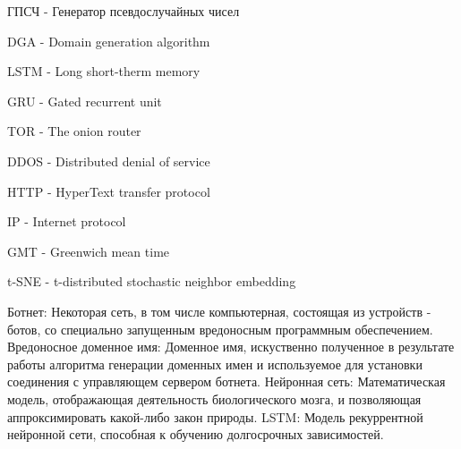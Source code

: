 \noindent ГПСЧ - Генератор псевдослучайных чисел

\noindent DGA - Domain generation algorithm

\noindent LSTM - Long short-therm memory

\noindent GRU - Gated recurrent unit

\noindent TOR - The onion router

\noindent DDOS - Distributed denial of service

\noindent HTTP - HyperText transfer protocol

\noindent IP - Internet protocol

\noindent GMT - Greenwich mean time

\noindent t-SNE - t-distributed stochastic neighbor embedding
\clearpage


\noindent Ботнет: Некоторая сеть, в том числе компьютерная, состоящая из устройств - ботов, со специально запущенным вредоносным программным обеспечением.
\newline
\linebreak
\noindent Вредоносное доменное имя: Доменное имя, искуственно полученное в результате работы алгоритма генерации доменных имен и используемое для установки соединения с управляющем сервером ботнета.
\newline
\linebreak
\noindent Нейронная сеть: Математическая модель, отображающая деятельность биологического мозга, и позволяющая аппроксимировать какой-либо закон природы.
\newline
\linebreak
\noindent LSTM: Модель рекуррентной нейронной сети, способная к обучению долгосрочных зависимостей.
\clearpage
